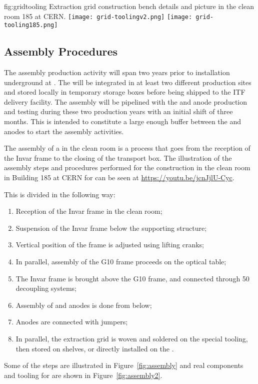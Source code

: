\begin{dunefigure}{fig:gridtooling}
{Extraction grid construction bench details and picture in the clean room 185 at CERN.}
\texttt{[image: grid-toolingv2.png]}
\texttt{[image: grid-tooling185.png]}
\end{dunefigure}

\subsection{Assembly Procedures}
\label{sec:fddp-crp-assy}

The  assembly production activity will span two years 
prior to  installation underground at \surf. The  will be integrated in at least two different production sites and stored locally in temporary storage boxes before being shipped to the ITF delivery facility. The  assembly will be pipelined with the  and anode production and testing during these two production years with an initial  shift of three months. This is intended to constitute a large enough buffer between the  and anodes to start the  assembly activities.

The assembly of a  in the clean room is a process that goes from the reception of the Invar frame to the  closing of the transport box. 
The illustration of the assembly steps and procedures performed for the   construction in the clean room in Building 185 at CERN for  can be seen at \url{https://youtu.be/jcnJjlU-Cyc}.

This is divided in the following way:
\begin{enumerate}
\item Reception of the Invar frame in the clean room;
\item  Suspension of the Invar frame below the supporting structure;
\item  Vertical position of the frame is adjusted using lifting cranks;
\item  In parallel, assembly of the G10 frame proceeds on the optical table;
\item  The Invar frame is brought above the G10 frame, and connected through \num{50} decoupling systems;
\item  Assembly of  and anodes is done from below;
\item  Anodes are connected with jumpers;
\item  In parallel, the extraction grid is woven and soldered on the special tooling, then stored on shelves, or directly installed on the .
\end{enumerate}
Some of the steps are illustrated in Figure~\ref{fig:assembly} and real components and tooling for  are shown in Figure~\ref{fig:assembly2}.

